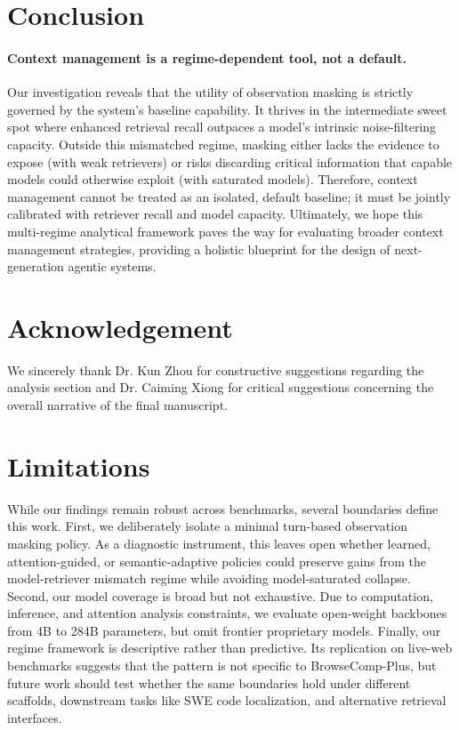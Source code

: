 \section{Conclusion}
\label{sec:discussion}

\paragraph{Context management is a regime-dependent tool, not a default.}
Our investigation reveals that the utility of observation masking is strictly governed by the system's baseline capability. It thrives in the intermediate sweet spot where enhanced retrieval recall outpaces a model's intrinsic noise-filtering capacity. Outside this mismatched regime, masking either lacks the evidence to expose (with weak retrievers) or risks discarding critical information that capable models could otherwise exploit (with saturated models). Therefore, context management cannot be treated as an isolated, default baseline; it must be jointly calibrated with retriever recall and model capacity. Ultimately, we hope this multi-regime analytical framework paves the way for evaluating broader context management strategies, providing a holistic blueprint for the design of next-generation agentic systems.

\section*{Acknowledgement} 
We sincerely thank Dr. Kun Zhou for constructive suggestions regarding the analysis section and Dr. Caiming Xiong for critical suggestions concerning the overall narrative of the final manuscript.

\section*{Limitations} 
While our findings remain robust across benchmarks, several boundaries define this work. First, we deliberately isolate a minimal turn-based observation masking policy. As a diagnostic instrument, this leaves open whether learned, attention-guided, or semantic-adaptive policies could preserve gains from the model-retriever mismatch regime while avoiding model-saturated collapse.
Second, our model coverage is broad but not exhaustive. Due to computation, inference, and attention analysis constraints, we evaluate open-weight backbones from 4B to 284B parameters, but omit frontier proprietary models.
Finally, our regime framework is descriptive rather than predictive. Its replication on live-web benchmarks suggests that the pattern is not specific to BrowseComp-Plus, but future work should test whether the same boundaries hold under different scaffolds, downstream tasks like SWE code localization, and alternative retrieval interfaces.


